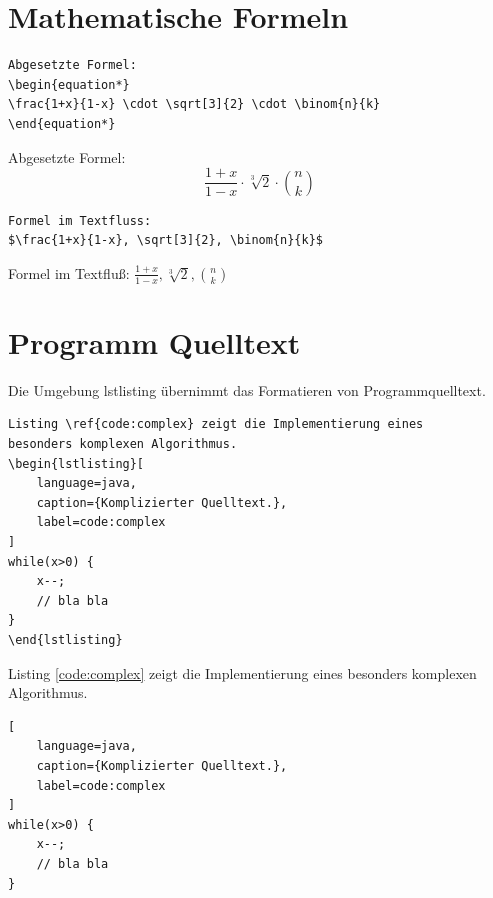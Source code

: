 \section{Mathematische Formeln}

\begin{Verbatim}[frame=single]
Abgesetzte Formel:
\begin{equation*}
\frac{1+x}{1-x} \cdot \sqrt[3]{2} \cdot \binom{n}{k}
\end{equation*}
\end{Verbatim}

Abgesetzte Formel:
\begin{equation*}
\frac{1+x}{1-x} \cdot \sqrt[3]{2} \cdot \binom{n}{k}
\end{equation*}

\begin{Verbatim}[frame=single]
Formel im Textfluss:
$\frac{1+x}{1-x}, \sqrt[3]{2}, \binom{n}{k}$
\end{Verbatim}

Formel im Textfluß: $\frac{1+x}{1-x}, \sqrt[3]{2}, \binom{n}{k}$
\\

\section{Programm Quelltext}

Die Umgebung lstlisting übernimmt das Formatieren von Programmquelltext.

\begin{minipage}[t]{\linewidth}
\begin{Verbatim}[frame=single]
Listing \ref{code:complex} zeigt die Implementierung eines 
besonders komplexen Algorithmus.
\begin{lstlisting}[
    language=java,
    caption={Komplizierter Quelltext.},
    label=code:complex
]
while(x>0) {
	x--;
	// bla bla
}
\end{lstlisting}
\end{Verbatim}
\end{minipage}

\begin{framed}
Listing \ref{code:complex} zeigt die Implementierung eines 
besonders komplexen Algorithmus.
\begin{lstlisting}[
    language=java,
    caption={Komplizierter Quelltext.},
    label=code:complex
]
while(x>0) {
	x--;
	// bla bla
}
\end{lstlisting}
\end{framed}

